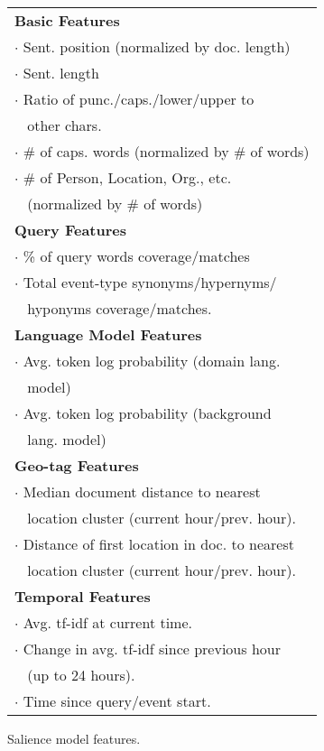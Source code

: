 \begin{figure}[t!]
\begin{tabular}{| l |} 
\hline
\textbf{Basic Features}\\
$\cdot$ Sent. position (normalized by doc. length) \\
$\cdot$ Sent. length \\
$\cdot$ Ratio of punc./caps./lower/upper to \\
$\;\;$ other chars. \\
$\cdot$ \# of caps. words (normalized by \# of words)\\
$\cdot$ \# of Person, Location, Org., etc.\\
$\;\;$ (normalized by \# of words)\\
\hline
\textbf{Query Features}\\
$\cdot$ \% of query words coverage/matches\\
$\cdot$ Total event-type synonyms/hypernyms/ \\
$\;\;$ hyponyms coverage/matches.\\
\hline
\textbf{Language Model Features}\\
$\cdot$ Avg. token log probability (domain lang. \\
$\;\;$ model)\\
$\cdot$ Avg. token log probability (background \\
$\;\;$ lang. model)\\
\hline
\textbf{Geo-tag Features}\\
$\cdot$ Median document distance to nearest  \\
$\;\;$ location cluster (current hour/prev. hour).\\
$\cdot$ Distance of first location in doc. to nearest \\
$\;\;$ location cluster (current hour/prev. hour).\\
\hline
\textbf{Temporal Features}\\
$\cdot$ Avg. tf-idf at current time.\\
$\cdot$ Change in avg. tf-idf since previous hour \\
$\;\;$  (up to 24 hours).\\
$\cdot$ Time since query/event start.\\
\hline
\end{tabular}
\caption{Salience model features.}
\end{figure}
